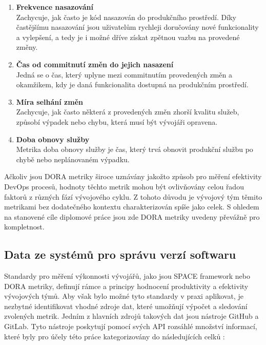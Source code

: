 \begin{enumerate}
    \item \textbf{Frekvence nasazování}\\
    Zachycuje, jak často je kód nasazován do produkčního prostředí. Díky častějšímu nasazování jsou uživatelům rychleji doručovány nové funkcionality a vylepšení, a tedy je i možné dříve získat zpětnou vazbu na provedené změny.
    \item \textbf{Čas od commitnutí změn do jejich nasazení}\\
    Jedná se o čas, který uplyne mezi commitnutím provedených změn a okamžikem, kdy je daná funkcionalita dostupná na produkčním prostředí.
    \item \textbf{Míra selhání změn}\\
    Zachycuje, jak často některá z provedených změn zhorší kvalitu služeb, způsobí výpadek nebo chybu, která musí být vývojáři opravena.
    \item \textbf{Doba obnovy služby}\\
    Metrika doba obnovy služby je čas, který trvá obnovit produkční službu po chybě nebo neplánovaném výpadku.
\end{enumerate}

Ačkoliv jsou DORA metriky široce uznávány jakožto způsob pro měření efektivity DevOps procesů, hodnoty těchto metrik mohou být ovlivňovány celou řadou faktorů z různých fází vývojového cyklu. Z tohoto důvodu je vývojový tým těmito metrikami bez dodatečného kontextu charakterizován spíše jako celek. S ohledem na stanovené cíle diplomové práce jsou zde DORA metriky uvedeny převážně pro kompletnost.

\subsection{Data ze systémů pro správu verzí softwaru}
Standardy pro měření výkonnosti vývojářů, jako jsou SPACE framework nebo DORA metriky, definují rámce a principy hodnocení produktivity a efektivity vývojových týmů. Aby však bylo možné tyto standardy v praxi aplikovat, je nezbytné identifikovat vhodné zdroje dat, které umožňují výpočet a sledování zvolených metrik. Jedním z hlavních zdrojů takových dat jsou nástroje GitHub a GitLab. Tyto nástroje poskytují pomocí svých API rozsáhlé množství informací, které byly pro účely této práce kategorizovány do následujících celků \cite{GitHub-REST, GitHub-GraphQL, GitLab-REST, GitLab-GraphQL}:

